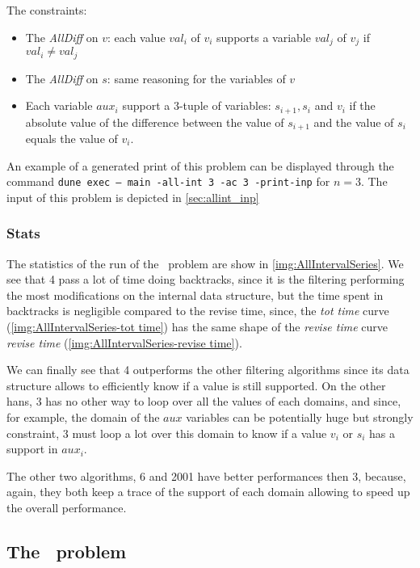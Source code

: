\documentclass{rapport}
\begin{document}
The constraints:
\begin{itemize}
  \item The \textit{AllDiff} on $v$: each value $val_i$ of $v_i$ supports a variable $val_j$ of $v_j$ if $val_i \neq val_j$
  \item The \textit{AllDiff} on $s$: same reasoning for the variables of $v$
  \item Each variable $aux_i$ support a $3$-tuple of variables: $s_{i+1}, s_i$ and $v_i$ if the absolute value of the difference between the value of $s_{i+1}$ and the value of $s_i$ equals the value of $v_i$.
\end{itemize}

An example of a generated print of this problem can be displayed through the command \texttt{dune exec -- main -all-int 3 -ac 3 -print-inp} for $n = 3$. The input of this problem is depicted in \cref{sec:allint_inp}


\subsubsection{Stats}


The statistics of the run of the \allint\ problem are show in \cref{img:AllIntervalSeries}. We see that \ac{4} pass a lot of time doing backtracks, since it is the filtering performing the most modifications on the internal data structure, but the time spent in backtracks is negligible compared to the revise time, since, the \textit{tot time} curve (\cref{img:AllIntervalSeries-tot time}) has the same shape of the \textit{revise time} curve \textit{revise time} (\cref{img:AllIntervalSeries-revise time}).

We can finally see that \ac{4} outperforms the other filtering algorithms since its data structure allows to efficiently know if a value is still supported. On the other hans, \ac{3} has no other way to loop over all the values of each domains, and since, for example, the domain of the $aux$ variables can be potentially huge but strongly constraint, \ac{3} must loop a lot over this domain to know if a value $v_i$ or $s_i$ has a support in $aux_i$.

The other two algorithms, \ac{6} and \ac{2001} have better performances then \ac{3}, because, again, they both keep a trace of the support of each domain allowing to speed up the overall performance.


\subsection{The \queens\ problem}
\end{document}
